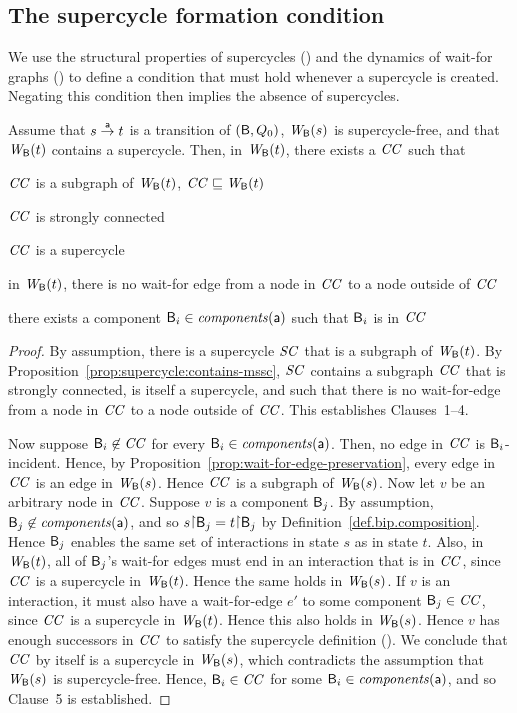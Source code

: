 


\subsection{The supercycle formation condition}

We use the structural properties of supercycles () and the dynamics of wait-for graphs ()
to define a condition that must hold whenever a supercycle is created. Negating this condition then implies the absence of supercycles.


\begin{proposition} \label{prop:supercycle-formation}
Assume that $s \goesto[\act] t$ is a transition of $(\B, Q_0)$, $\wfg{\B}{s}$ is supercycle-free, and that $\wfg{\B}{t}$
contains a supercycle.  Then, in $\wfg{\B}{t}$, there exists a $\CC$ such that
\bn
\item $\CC$ is a subgraph of $\wfg{\B}{t}$, \ie $\CC \subg \wfg{\B}{t}$
\item $\CC$ is strongly connected
\item $\CC$ is a supercycle
\item  in $\wfg{\B}{t}$, there is no wait-for edge from a node in $\CC$ to a node outside of $\CC$
\item there exists a component $\B_i \in \cmps{\act}$ such that $\B_i$ is in $\CC$
\en
\end{proposition}
%
\begin{proof}
  By assumption, there is a supercycle $\SC$ that is a subgraph of $\wfg{\B}{t}$.  By Proposition~\ref{prop:supercycle:contains-mssc}, $\SC$ contains
  a subgraph $\CC$ that is strongly connected, is itself a supercycle, and such that there is no wait-for-edge from a node in $\CC$ to a node outside
  of $\CC$.  This establishes Clauses~1--4.

Now suppose $\B_i \not\in \CC$ for every $\B_i \in \cmps{\act}$. Then, no edge in $\CC$ is
$\B_i$-incident.  Hence, by Proposition~\ref{prop:wait-for-edge-preservation}, every edge in $\CC$
is an edge in $\wfg{\B}{s}$. Hence $\CC$ is a subgraph of $\wfg{\B}{s}$.
%
Now let $v$ be an arbitrary node in $\CC$.
%
Suppose $v$ is a component $\B_j$.  By assumption, $\B_j \not\in \cmps{\act}$, and so
$s \pj \B_j = t \pj \B_j$ by Definition~\ref{def.bip.composition}. Hence $\B_j$ enables the same set
of interactions in state $s$ as in state $t$. Also, in $\wfg{\B}{t}$, all of $\B_j$'s wait-for edges
must end in an interaction that is in $\CC$, since $\CC$ is a supercycle in $\wfg{\B}{t}$. Hence the
same holds in $\wfg{\B}{s}$.
%
If $v$ is an interaction, it must also have a wait-for-edge $e'$ to some component $\B_j \in \CC$,
since $\CC$ is a supercycle in $\wfg{\B}{t}$. Hence this also holds in $\wfg{\B}{s}$.
%
Hence $v$ has enough successors in $\CC$ to satisfy the supercycle definition ().
%
We conclude that $\CC$ by itself is a supercycle in $\wfg{\B}{s}$, which contradicts the assumption
that $\wfg{\B}{s}$ is supercycle-free. Hence, $\B_i \in \CC$ for some $\B_i \in \cmps{\act}$, and so
Clause~5 is established.  
\end {proof}


